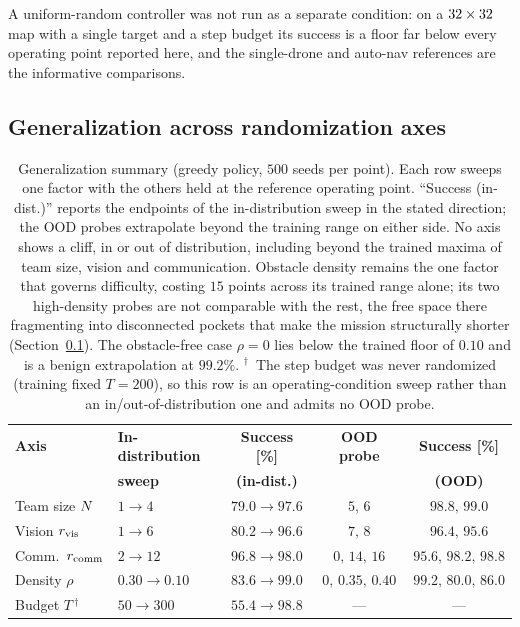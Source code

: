 A uniform-random controller was not run as a separate condition: on a
$32\times32$ map with a single target and a step budget its success
is a floor far below every operating point reported here, and the single-drone
and auto-nav references are the informative comparisons.

\subsection{Generalization across randomization axes}
\label{subsec:exp-generalization}

\begin{table}[t]
\centering
\small
\begin{tabular}{llccc}
\toprule
\textbf{Axis} & \textbf{In-distribution} & \textbf{Success [\%]} &
\textbf{OOD probe} & \textbf{Success [\%]} \\
 & \textbf{sweep} & \textbf{(in-dist.)} & & \textbf{(OOD)} \\
\midrule
Team size $N$      & $1 \to 4$        & $79.0 \to 97.6$ & $5,\,6$          & $98.8,\,99.0$ \\
Vision $r_{\mathrm{vis}}$            & $1 \to 6$        & $80.2 \to 96.6$ & $7,\,8$          & $96.4,\,95.6$ \\
Comm.\ $r_{\mathrm{comm}}$           & $2 \to 12$       & $96.8 \to 98.0$ & $0,\,14,\,16$    & $95.6,\,98.2,\,98.8$ \\
Density $\rho$            & $0.30 \to 0.10$  & $83.6 \to 99.0$ & $0,\,0.35,\,0.40$ & $99.2,\,80.0,\,86.0$ \\
Budget $T$\,$^\dagger$    & $50 \to 300$     & $55.4 \to 98.8$ & ---              & --- \\
\bottomrule
\end{tabular}
\caption{Generalization summary (greedy policy, $500$ seeds per point).
Each row sweeps one factor with the others held at the reference operating
point. ``Success (in-dist.)'' reports the endpoints of the in-distribution
sweep in the stated direction; the OOD probes extrapolate beyond the
training range on either side. No axis shows a cliff, in or out of
distribution, including beyond the trained maxima of team size, vision and
communication. Obstacle density remains the one factor that governs
difficulty, costing $15$ points across its trained range alone; its two
high-density probes are not comparable with the rest, the free space there
fragmenting into disconnected pockets that make the mission structurally
shorter (Section~\ref{subsec:exp-generalization}). The obstacle-free case
$\rho = 0$ lies below the trained floor of $0.10$ and is a benign
extrapolation at $99.2\%$.
$^\dagger$~The step budget was never randomized (training fixed $T = 200$), so
this row is an operating-condition sweep rather than an in/out-of-distribution
one and admits no OOD probe.}
\label{tab:generalization}
\end{table}

